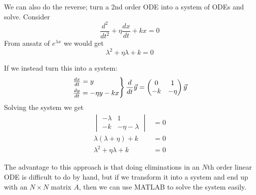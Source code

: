 \documentclass[10pt]{scrartcl}
\begin{document}
We can also do the reverse; turn a 2nd order ODE into a system of ODEs and solve. Consider
\[
  \frac{d^2}{dt^2} + \eta \frac{dx}{dt} + kx = 0
\]
From ansatz of $e^{\lambda x}$ we would get
\[
  \lambda^2 + \eta \lambda + k = 0
\]

If we instead turn this into a system:
\[
  \begin{rcases*}
  \frac{dx}{dt} = y\\
  	\frac{dy}{dt} = -\eta y - kx
  \end{rcases*}
  \frac{d}{dt}\vec{y} = \begin{pmatrix}
 0 & 1 \\ -k & - \eta 	
 \end{pmatrix}\vec{y}
\]
Solving the system we get 
\begin{align*}
  \begin{vmatrix}
  -\lambda & 1\\ -k & -\eta - \lambda 	
  \end{vmatrix} &= 0\\
  \lambda(\lambda + \eta) + k &= 0\\
  \lambda^2 + \eta\lambda + k &= 0
\end{align*}

The advantage to this approach is that doing eliminations in an $N$th order linear ODE is difficult to do by hand, but if we transform it into a system and end up with an $N \times N$ matrix $A$, then we can use MATLAB to solve the system easily.\\
\end{document}
